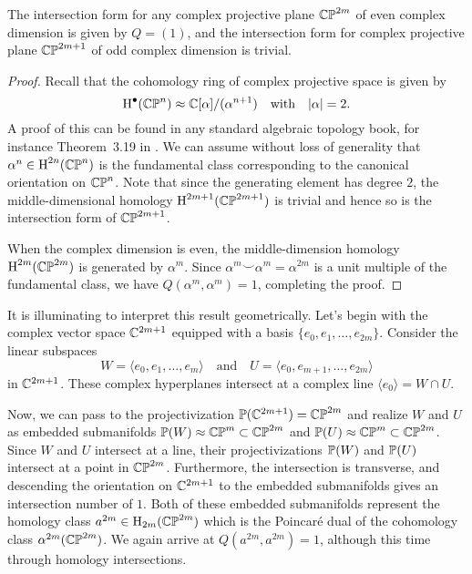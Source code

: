 \begin{proposition}\label{prop:intersection-form-complex-projective-plane}
	The intersection form for any complex projective plane $\CP^{2m}$ of even complex dimension is given by $Q=(1)$, and the intersection form for complex projective plane $\CP^{2m+1}$ of odd complex dimension is trivial.
\end{proposition}
\begin{proof}
 Recall that the cohomology ring of complex projective space is given by
 \begin{equation}
	 \H^\bullet(\CP^{n}) \approx \C[\alpha]/(\alpha^{n+1})\quad\textrm{with}\quad |\alpha|=2.
 \end{equation}
 A proof of this can be found in any standard algebraic topology book, for instance Theorem~3.19 in \cite{hatcher2002topology}. We can assume without loss of generality that $\alpha^n\in \H^{2n}(\CP^n)$ is the fundamental class corresponding to the canonical orientation on $\CP^n$.
 Note that since the generating element has degree $2$, the middle-dimensional homology $\H^{2m+1}(\CP^{2m+1})$ is trivial and hence so is the intersection form of $\CP^{2m+1}$. 

 When the complex dimension is even, the middle-dimension homology $\H^{2m}(\CP^{2m})$ is generated by $\alpha^m$. Since $\alpha^m\smile \alpha^m=\alpha^{2m}$ is a unit multiple of the fundamental class, we have $Q(\alpha^m, \alpha^m)=1$, completing the proof.
\end{proof}

It is illuminating to interpret this result geometrically. Let's begin with the complex vector space $\C^{2m+1}$ equipped with a basis $\{e_0, e_1,\ldots, e_{2m}\}$. Consider the linear subspaces
\begin{equation}
	W = \langle e_0, e_1,\ldots, e_m\rangle \quad\textrm{and}\quad U = \langle e_0, e_{m+1},\ldots, e_{2m}\rangle
\end{equation}
in $\C^{2m+1}$. These complex hyperplanes intersect at a complex line $\langle e_0 \rangle = W\cap U$.

Now, we can pass to the projectivization $\P(\C^{2m+1})=\CP^{2m}$ and realize $W$ and $U$ as embedded submanifolds $\P(W)\approx \CP^m\subset \CP^{2m}$ and $\P(U)\approx \CP^m\subset \CP^{2m}$. Since $W$ and $U$ intersect at a line, their projectivizations $\P(W)$ and $\P(U)$ intersect at a point in $\CP^{2m}$. Furthermore, the intersection is transverse, and descending the orientation on $\C^{2m+1}$ to the embedded submanifolds gives an intersection number of $1$. Both of these embedded submanifolds represent the homology class $a^{2m}\in \H_{2m}(\CP^{2m})$ which is the Poincar\'e dual of the cohomology class $\alpha^{2m}(\CP^{2m})$. We again arrive at $Q(a^{2m}, a^{2m})=1$, although this time through homology intersections.

